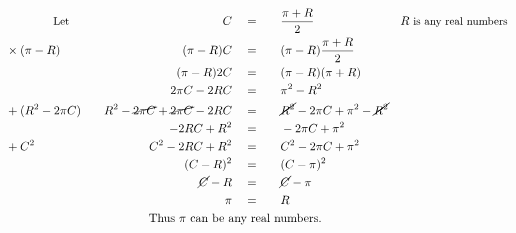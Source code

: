 \begin{alignat*}{5}
&\qquad\qquad\small\text{Let}&C\quad&=\quad&&\frac{\pi+R}{2}\qquad&\small R\text{ is any real numbers}\\
&\small\times(\pi-R)&(\pi-R)C\quad&=&&(\pi-R)\frac{\pi+R}{2}\\
&\,&(\pi-R)2C\quad&=&&(\pi-R)(\pi+R)\\
&\,&2\pi C-2RC\quad&=&&\pi^2-R^2\\
&\small+(R^2-2\pi C)\quad&R^2-\cancel{2\pi C}+\cancel{2\pi C}-2RC\quad&=&&\cancel{R^2}-2\pi C+\pi^2-\cancel{R^2}\\
&\,&-2RC+R^2\quad&=&&-2\pi C+\pi^2\\
&\small+C^2&C^2-2RC+R^2\quad&=&&C^2-2\pi C+\pi^2\\
&\,&(C-R)^2\quad&=&&(C-\pi)^2\\
&\,&\cancel{C}-R\quad&=&&\cancel{C}-\pi\\
&\,&\pi\quad&=&&R\\
&\rlap{\qquad\qquad\qquad\qquad\qquad\qquad\text{Thus $\pi$ can be any real numbers.}}
\end{alignat*}
